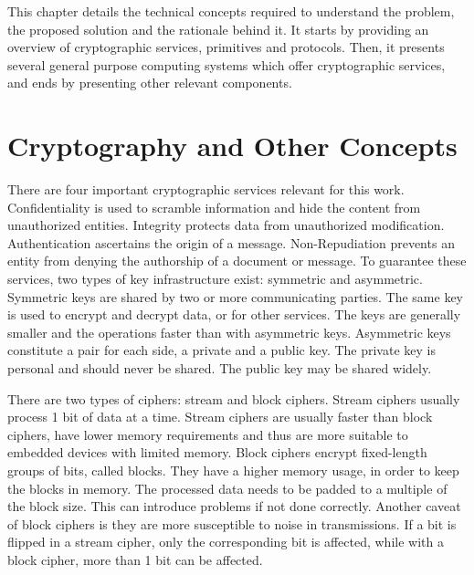 \cleardoublepage
\label{chap:background}

This chapter details the technical concepts required to understand the problem, the proposed solution and the rationale behind it. It starts by providing an overview of cryptographic services, primitives and protocols. Then, it presents several general purpose computing systems which offer cryptographic services, and ends by presenting other relevant components.

\section{Cryptography and Other Concepts}\label{chap:background:crypto}

There are four important cryptographic services relevant for this work. Confidentiality is used to scramble information and hide the content from unauthorized entities. Integrity protects data from unauthorized modification. Authentication ascertains the origin of a message. Non-Repudiation prevents an entity from denying the authorship of a document or message.
To guarantee these services, two types of key infrastructure exist: symmetric and asymmetric. 
Symmetric keys are shared by two or more communicating parties. The same key is used to encrypt and decrypt data, or for other services. The keys are generally smaller and the operations faster than with asymmetric keys. Asymmetric keys constitute a pair for each side, a private and a public key. The private key is personal and should never be shared. The public key may be shared widely.

There are two types of ciphers: stream and block ciphers. Stream ciphers usually process 1 bit of data at a time. Stream ciphers are usually faster than block ciphers, have lower memory requirements and thus are more suitable to embedded devices with limited memory. Block ciphers encrypt fixed-length groups of bits, called blocks. They have a higher memory usage, in order to keep the blocks in memory. The processed data needs to be padded to a multiple of the block size. This can introduce problems if not done correctly. Another caveat of block ciphers is they are more susceptible to noise in transmissions. If a bit is flipped in a stream cipher, only the corresponding bit is affected, while with a block cipher, more than 1 bit can be affected.

